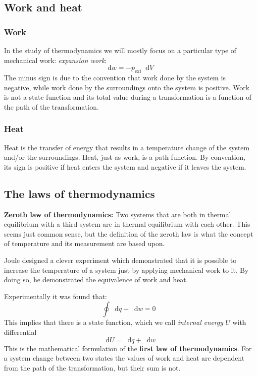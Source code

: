 \documentclass[12pt,a4paper]{report}
\newcommand*\diff{\mathop{}\!\mathrm{d}}
\begin{document}
   \subsection*{Work and heat}
   \subsubsection{Work}
   In the study of thermodynamics we will mostly focus on a particular type of mechanical work: \textit{expansion work}:
   \begin{equation*}
   \diff w=-p_{\mathrm{ext}}\diff V
   \end{equation*}
   The minus sign is due to the convention that work done by the system is negative, while work done by the surroundings onto the system is positive. Work is not a state function and its total value during a transformation is a function of the path of the transformation.
   \subsubsection{Heat}
   Heat is the transfer of energy that results in a temperature change of the system and/or the surroundings. 
   Heat, just as work, is a path function. By convention, its sign is positive if heat enters the system and negative if it leaves the system.
   \subsection*{The laws of thermodynamics}
   \textbf{Zeroth law of thermodynamics:} Two systems that are both in thermal equilibrium with a third system are in thermal equilibrium with each other. This seems just common sense, but the definition of the zeroth law is what the concept of temperature and its measurement are based upon.
   
   Joule designed a clever experiment which demonstrated that it is possible to increase the temperature of a system just by applying mechanical work to it. By doing so, he demonstrated the equivalence of work and heat.
   
   Experimentally it was found that:
   \begin{equation*}
   \oint\diff q+\diff w=0
   \end{equation*}
   This implies that there is a state function, which we call \textit{internal energy} $U$ with differential 
   \begin{equation*}
   \diff U=\diff q+\diff w
   \end{equation*}
   This is the mathematical formulation of the \textbf{first law of thermodynamics}.
   For a system change between two states the values of work and heat are dependent from the path of the transformation, but their sum is not. 
   
\end{document}
